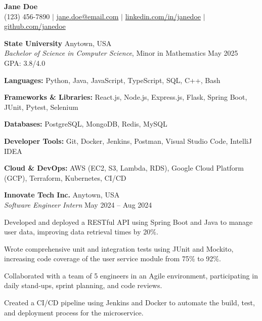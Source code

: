 

\begin{center}
    {\Huge \textbf{Jane Doe}} \\ \vspace{5pt}
    (123) 456-7890 $|$ \href{mailto:jane.doe@email.com}{\url{jane.doe@email.com}} $|$ 
    \href{https://www.linkedin.com/in/janedoe}{\url{linkedin.com/in/janedoe}} $|$ 
    \href{https://github.com/janedoe}{\url{github.com/janedoe}}
\end{center}

\textbf{State University} \hfill Anytown, USA \\
\textit{Bachelor of Science in Computer Science}, Minor in Mathematics \hfill May 2025 \\
GPA: 3.8/4.0

\begin{itemize*}{\itemsep=0pt \topsep=0pt}
    \item \textbf{Languages:} Python, Java, JavaScript, TypeScript, SQL, C++, Bash
    \item \textbf{Frameworks \& Libraries:} React.js, Node.js, Express.js, Flask, Spring Boot, JUnit, Pytest, Selenium
    \item \textbf{Databases:} PostgreSQL, MongoDB, Redis, MySQL
    \item \textbf{Developer Tools:} Git, Docker, Jenkins, Postman, Visual Studio Code, IntelliJ IDEA
    \item \textbf{Cloud \& DevOps:} AWS (EC2, S3, Lambda, RDS), Google Cloud Platform (GCP), Terraform, Kubernetes, CI/CD
\end{itemize*}

\textbf{Innovate Tech Inc.} \hfill Anytown, USA \\
\textit{Software Engineer Intern} \hfill May 2024 -- Aug 2024
\begin{itemize*}{\itemsep=0pt \topsep=0pt}
    \item Developed and deployed a RESTful API using Spring Boot and Java to manage user data, improving data retrieval times by 20\%.
    \item Wrote comprehensive unit and integration tests using JUnit and Mockito, increasing code coverage of the user service module from 75\% to 92\%.
    \item Collaborated with a team of 5 engineers in an Agile environment, participating in daily stand-ups, sprint planning, and code reviews.
    \item Created a CI/CD pipeline using Jenkins and Docker to automate the build, test, and deployment process for the microservice.
\end{itemize*}

